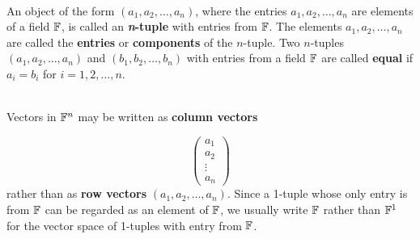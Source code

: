 \begin{definition}
	\hfill\\
	An object of the form $(a_1, a_2, \dots, a_n)$, where the entries $a_1, a_2, \dots, a_n$ are elements of a field $\mathbb{F}$, is called an \textbf{\textit{n}-tuple} with entries from $\mathbb{F}$. The elements $a_1, a_2, \dots, a_n$ are called the \textbf{entries} or \textbf{components} of the $n$-tuple. Two $n$-tuples $(a_1, a_2, \dots, a_n)$ and $(b_1, b_2, \dots, b_n)$ with entries from a field $\mathbb{F}$ are called \textbf{equal} if $a_i = b_i$ for $i=1, 2, \dots, n$.
\end{definition}

\begin{definition}
	\hfill\\
	Vectors in $\mathbb{F}^n$ may be written as \textbf{column vectors}

	\[\begin{pmatrix} a_1 \\ a_2 \\ \vdots \\ a_n \end{pmatrix}\]
	rather than as \textbf{row vectors} $(a_1, a_2, \dots, a_n)$. Since a 1-tuple whose only entry is from $\mathbb{F}$ can be regarded as an element of $\mathbb{F}$, we usually write $\mathbb{F}$ rather than $\mathbb{F}^1$ for the vector space of 1-tuples with entry from $\mathbb{F}$.
\end{definition}

